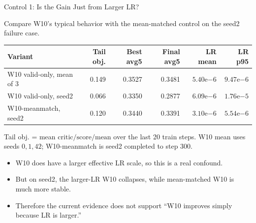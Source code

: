 \documentclass[aspectratio=169]{beamer}
\begin{document}
\begin{frame}{Control 1: Is the Gain Just from Larger LR?}
\small

Compare W10's typical behavior with the mean-matched control on the seed2 failure case.

\begin{center}
\scriptsize
\begin{tabular}{lrrrrr}
\toprule
Variant & Tail obj. & Best avg5 & Final avg5 & LR mean & LR p95 \\
\midrule
W10 valid-only, mean of 3 & 0.149 & 0.3527 & 0.3481 & \(5.40\mathrm{e}{-6}\) & \(9.47\mathrm{e}{-6}\) \\
W10 valid-only, seed2 & 0.066 & 0.3350 & 0.2877 & \(6.09\mathrm{e}{-6}\) & \(1.76\mathrm{e}{-5}\) \\
W10-meanmatch, seed2 & 0.120 & 0.3440 & 0.3391 & \(3.10\mathrm{e}{-6}\) & \(5.54\mathrm{e}{-6}\) \\
\bottomrule
\end{tabular}
\end{center}

\vspace{0.3em}

{\footnotesize\color{Muted}
Tail obj. = mean \(\mathrm{critic/score/mean}\) over the last 20 train steps.
W10 mean uses seeds \(0,1,42\); W10-meanmatch is seed2 completed to step 300.
}

\vspace{0.5em}

\begin{itemize}
  \item W10 does have a larger effective LR scale, so this is a real confound.
  \item But on seed2, the larger-LR W10 collapses, while mean-matched W10 is much more stable.
  \item Therefore the current evidence does not support ``W10 improves simply because LR is larger.''
\end{itemize}

\end{frame}
\end{document}
